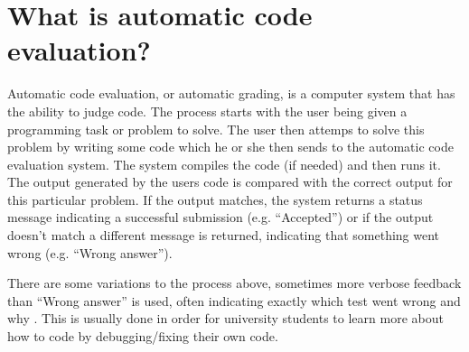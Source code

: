 \section{What is automatic code evaluation?}
Automatic code evaluation, or automatic grading, is a computer system that has the ability to judge code. The process starts with the user being given a programming task or problem to solve. The user then attemps to solve this problem by writing some code which he or she then sends to the automatic code evaluation system. The system compiles the code (if needed) and then runs it. The output generated by the users code is compared with the correct output for this particular problem. If the output matches, the system returns a status message indicating a successful submission (e.g. ``Accepted'') or if the output doesn't match a different message is returned, indicating that something went wrong (e.g. ``Wrong answer''). 

There are some variations to the process above, sometimes more verbose feedback than ``Wrong answer'' is used, often indicating exactly which test went wrong and why \cite{Gradebot}. This is usually done in order for university students to learn more about how to code by debugging/fixing their own code.
